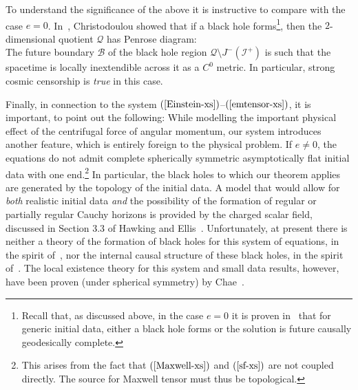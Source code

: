 \documentclass{article}
\begin{document}
To understand the significance of the above it is instructive to compare with
the case $e=0$. In~\cite{chr:fbh}, Christodoulou 
showed that if a black hole forms\footnote{Recall that, as discussed
above, in the case $e=0$ it is proven in~\cite{chr:ins}
that for generic initial data, either
a black hole forms or the solution is future causally
geodesically complete.}, then the
$2$-dimensional quotient $\mathcal{Q}$ has Penrose diagram:
\[

\]
The future boundary $\mathcal{B}$ of the black hole region 
$\mathcal{Q}\setminus
J^-(\mathcal{I}^+)$ is such that the
spacetime is locally inextendible across it as a $C^0$ metric.
In particular, strong cosmic censorship is
\emph{true} in this case. 

Finally, in connection to the system $(\ref{Einstein-xs})$--$(\ref{emtensor-xs})$,
it is important, to point out the following:
While modelling the important physical effect of the centrifugal
force of angular momentum, our system introduces another 
feature, which is entirely foreign to the physical problem.
If $e\neq0$, the equations do not admit complete spherically
symmetric asymptotically flat initial data
with one end.\footnote{This arises from the fact that $(\ref{Maxwell-xs})$
and $(\ref{sf-xs})$ are not coupled directly. The source for Maxwell tensor
must thus be topological.} 
In particular, the black holes to which our theorem applies are
generated by the topology of the initial data. A model that would
allow for \emph{both} realistic initial data \emph{and} the possibility of
the formation of regular or partially regular Cauchy horizons is provided
by the charged scalar field, discussed in Section 3.3 of Hawking and 
Ellis~\cite{he:lssst}. Unfortunately, at present there is neither
a theory of the formation of black holes for this system of equations,
in the spirit of~\cite{chr:ins}, nor 
the internal causal structure of these black holes, in the spirit of~\cite{md:cbh}.
The local existence theory for this system and small data results, however, have been
proven (under spherical symmetry) by Chae~\cite{doc:ge}.
\end{document}
